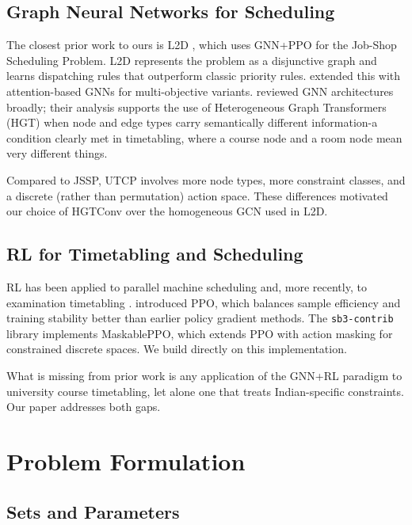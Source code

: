 \documentclass[conference]{IEEEtran}
\begin{document}
\subsection{Graph Neural Networks for Scheduling}

The closest prior work to ours is L2D \cite{zhang2020l2d}, which uses GNN+PPO for the Job-Shop Scheduling Problem. L2D represents the problem as a disjunctive graph and learns dispatching rules that outperform classic priority rules. \citet{zhang2024} extended this with attention-based GNNs for multi-objective variants. \citet{zhou2020} reviewed GNN architectures broadly; their analysis supports the use of Heterogeneous Graph Transformers (HGT) \cite{hu2020hgt} when node and edge types carry semantically different information-a condition clearly met in timetabling, where a course node and a room node mean very different things.

Compared to JSSP, UTCP involves more node types, more constraint classes, and a discrete (rather than permutation) action space. These differences motivated our choice of HGTConv over the homogeneous GCN used in L2D.

\subsection{RL for Timetabling and Scheduling}

RL has been applied to parallel machine scheduling \cite{zhang2020rl} and, more recently, to examination timetabling \cite{tan2021}. \citet{schulman2017} introduced PPO, which balances sample efficiency and training stability better than earlier policy gradient methods. The \texttt{sb3-contrib} library \cite{raffin2021} implements MaskablePPO, which extends PPO with action masking for constrained discrete spaces. We build directly on this implementation.

What is missing from prior work is any application of the GNN+RL paradigm to university course timetabling, let alone one that treats Indian-specific constraints. Our paper addresses both gaps.


\section{Problem Formulation}
\label{sec:problem}

\subsection{Sets and Parameters}
\end{document}
